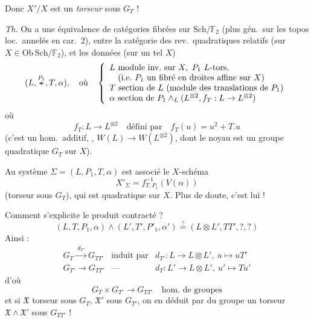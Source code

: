 \documentclass[11pt,a4paper]{article}
\begin{document}
Donc $X'/X$ est un \emph{torseur} sous $G_{T}$ ! 

\emph{Th.} On a une équivalence de catégories  fibrées sur $\mathrm{Sch}/\mathbb{F}_{2}$ (plus gén.\ sur les topos loc.\ annelés en car.\ 2), entre la catégorie des rev.\ quadratiques relatifs (sur $X \in \mathrm{Ob}\,\mathrm{Sch}/\mathbb{F}_{2}$), et les données (sur un tel $X$)
\[
  (L, \overset{P_{1}}{\text{\struck{$\ast$}}}, T, \alpha), \quad\text{où}\quad
  \left\{\begin{array}{l}
    L \text{ module inv.\ sur } X, \ P_{1} \ L\text{-tors.}\\
    \quad \text{(i.e.\ $P_{1}$ un fibré en droites affine sur $X$)}\\
    T \text{ section de } L \text{ (module des translations de $P_{1}$)}\\
    \alpha \text{ section de } P_{1} \wedge_{L} (L^{\otimes 2}, f_{T} : L \to L^{\otimes 2})
  \end{array}\right.
\]
où
\[
  f_{T} : L \to L^{\otimes 2} \quad\text{défini par}\quad f_{T}(u) = u^{2} + T.u
\]
(c'est un  hom.\ additif, , $W(L) \to W(L^{\otimes 2})$, dont le noyau est un groupe  quadratique $G_{T}$ sur $X$).

Au système $\Sigma = (L, P_{1}, T, \alpha)$ est associé le $X$-schéma
\[
  X'_{\Sigma} = f_{T, P_{1}}^{-1}(V(\alpha))
\]
(torseur sous $G_{T}$), qui est  quadratique sur $X$. Plus de doute, c'est lui !


Comment s'explicite le produit contracté ?
\[
  (L, T, P_{1}, \alpha) \wedge (L', T', P'_{1}, \alpha') \overset{?}{=} (L \otimes L', TT', ?, ?)
\]
 Ainsi :
\[
  \begin{array}{lll}
    G_{T} \xrightarrow{\ d_{T'}\ } G_{TT'} & \text{induit par} & d_{T'} : L \to L \otimes L', \ u \mapsto uT'\\
    G_{T'} \longrightarrow G_{TT'} & \text{—} & d_{T} : L' \to L \otimes L', \ u' \mapsto Tu'
  \end{array}
\]
d'où
\[
  G_{T} \times G_{T'} \longrightarrow G_{TT'} \quad\text{hom.\ de groupes}
\]
et si  $\mathfrak{X}$ torseur sous $G_{T}$, $\mathfrak{X}'$ sous $G_{T'}$, on en déduit par  du groupe un torseur $\mathfrak{X} \wedge \mathfrak{X}'$ sous $G_{TT'}$ !
\end{document}
